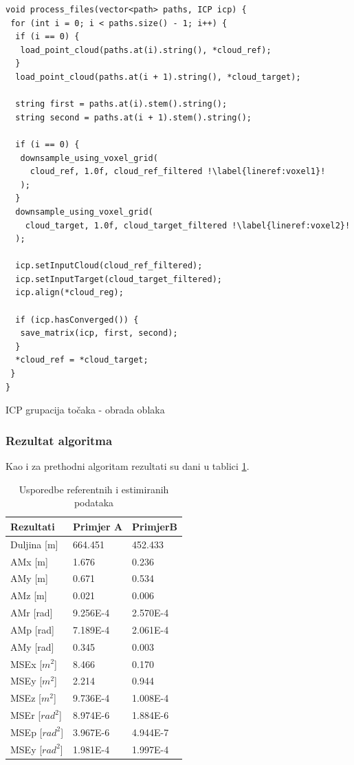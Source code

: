 \begin{listing}[H]
  \begin{verbatim}
void process_files(vector<path> paths, ICP icp) {
 for (int i = 0; i < paths.size() - 1; i++) {
  if (i == 0) {
   load_point_cloud(paths.at(i).string(), *cloud_ref);
  }
  load_point_cloud(paths.at(i + 1).string(), *cloud_target);

  string first = paths.at(i).stem().string(); 
  string second = paths.at(i + 1).stem().string();

  if (i == 0) {
   downsample_using_voxel_grid(
     cloud_ref, 1.0f, cloud_ref_filtered !\label{lineref:voxel1}!
   );
  }
  downsample_using_voxel_grid(
    cloud_target, 1.0f, cloud_target_filtered !\label{lineref:voxel2}!
  );

  icp.setInputCloud(cloud_ref_filtered);
  icp.setInputTarget(cloud_target_filtered);
  icp.align(*cloud_reg);

  if (icp.hasConverged()) {
   save_matrix(icp, first, second);
  }
  *cloud_ref = *cloud_target;
 }
}
  \end{verbatim}
  \caption{ICP grupacija točaka - obrada oblaka}
  \label{coderef:voxel_grouping}
\end{listing}
\pagebreak
\subsubsection{Rezultat algoritma}
Kao i za prethodni algoritam rezultati su dani u tablici \ref{res:ref_est_table_vox}.

\begin{table}[H]
  \centering
  \begin{tabular}{ |p{3cm}| |p{3cm}|p{3cm}| }
    \hline
    Rezultati& Primjer A& PrimjerB\\
    \hline
    Duljina [m]& 664.451& 452.433\\
    AMx [m]& 1.676& 0.236\\
    AMy [m]& 0.671& 0.534\\
    AMz [m]& 0.021& 0.006\\
    AMr [rad]& 9.256E-4& 2.570E-4\\
    AMp [rad]& 7.189E-4& 2.061E-4\\
    AMy [rad]& 0.345& 0.003\\
    \hline
    MSEx [$m^2$]& 8.466& 0.170\\
    MSEy [$m^2$]& 2.214& 0.944\\
    MSEz [$m^2$]& 9.736E-4& 1.008E-4\\
    MSEr [$rad^2$]& 8.974E-6& 1.884E-6\\
    MSEp [$rad^2$]& 3.967E-6& 4.944E-7\\
    MSEy [$rad^2$]& 1.981E-4& 1.997E-4\\
    \hline
  \end{tabular}
  \caption{Usporedbe referentnih i estimiranih podataka}
  \label{res:ref_est_table_vox}
\end{table}
\pagebreak

